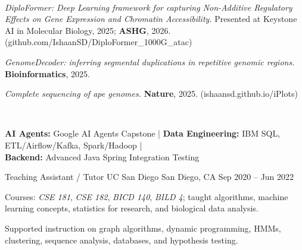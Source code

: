 \documentclass[11pt, a4paper]{awesome-cv}
\begin{document}
\begin{cventries}
\cventry
{~}{~}{~}{~}
{
\begin{cvitems}
\item {\textit{DiploFormer: Deep Learning framework for capturing Non-Additive Regulatory Effects on Gene Expression and Chromatin Accessibility.} Presented at Keystone AI in Molecular Biology, 2025; \textbf{ASHG}, 2026. (github.com/IshaanSD/DiploFormer\_1000G\_atac)}
\item {\textit{GenomeDecoder: inferring segmental duplications in repetitive genomic regions.} \textbf{Bioinformatics}, 2025.}
\item {\textit{Complete sequencing of ape genomes.} \textbf{Nature}, 2025.} (ishaansd.github.io/iPlots)
\end{cvitems}
}
\end{cventries}

\begin{cventries}
\cventry
{~}{~}{~}{~}
{
\begin{cvitems}
\item {\textbf{AI Agents:} Google AI Agents Capstone \quad | \quad \textbf{Data Engineering:} IBM SQL, ETL/Airflow/Kafka, Spark/Hadoop \quad | \quad \\ \textbf{Backend:} Advanced Java Spring Integration Testing}
\end{cvitems}
}
\end{cventries}

\begin{cventries}
\cventry
{Teaching Assistant / Tutor}
{UC San Diego}
{San Diego, CA}
{Sep 2020 -- Jun 2022}
{
\begin{cvitems}
\item {Courses: \textit{CSE 181}, \textit{CSE 182}, \textit{BICD 140}, \textit{BILD 4}; taught algorithms, machine learning concepts, statistics for research, and biological data analysis.}
\item {Supported instruction on graph algorithms, dynamic programming, HMMs, clustering, sequence analysis, databases, and hypothesis testing.}
\end{cvitems}
}
\end{cventries}
\end{document}

